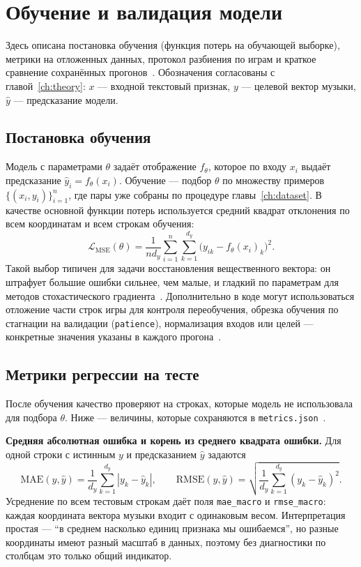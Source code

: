 \chapter{Обучение и валидация модели}
\label{ch:training}

Здесь описана постановка обучения (функция потерь на обучающей выборке), метрики на отложенных данных, протокол разбиения по играм и краткое сравнение сохранённых прогонов~\cite{nikolenko2018}. Обозначения согласованы с главой~\ref{ch:theory}: $x$ --- входной текстовый признак, $y$ --- целевой вектор музыки, $\hat y$ --- предсказание модели.

\section{Постановка обучения}

Модель с параметрами $\theta$ задаёт отображение $f_\theta$, которое по входу $x_i$ выдаёт предсказание $\hat y_i = f_\theta(x_i)$. Обучение --- подбор $\theta$ по множеству примеров $\{(x_i, y_i)\}_{i=1}^n$, где пары уже собраны по процедуре главы~\ref{ch:dataset}. В качестве основной функции потерь используется средний квадрат отклонения по всем координатам и всем строкам обучения:
\begin{equation}
\mathcal{L}_{\mathrm{MSE}}(\theta) = \frac{1}{n d_y} \sum_{i=1}^n \sum_{k=1}^{d_y} \bigl( y_{ik} - f_\theta(x_i)_k \bigr)^2 .
\label{eq:mse-ch3}
\end{equation}
Такой выбор типичен для задачи восстановления вещественного вектора: он штрафует большие ошибки сильнее, чем малые, и гладкий по параметрам для методов стохастического градиента~\cite{nikolenko2018}. Дополнительно в коде могут использоваться отложение части строк игры для контроля переобучения, обрезка обучения по стагнации на валидации (\texttt{patience}), нормализация входов или целей --- конкретные значения указаны в  каждого прогона~.

\section{Метрики регрессии на тесте}

После обучения качество проверяют на строках, которые модель не использовала для подбора $\theta$. Ниже --- величины, которые сохраняются в \texttt{metrics.json}~.

\textbf{Средняя абсолютная ошибка и корень из среднего квадрата ошибки.} Для одной строки с истинным $y$ и предсказанием $\hat y$ задаются
\[
\mathrm{MAE}(y, \hat y) = \frac{1}{d_y} \sum_{k=1}^{d_y} |y_k - \hat y_k|, \qquad
\mathrm{RMSE}(y, \hat y) = \sqrt{\frac{1}{d_y} \sum_{k=1}^{d_y} (y_k - \hat y_k)^2}.
\]
Усреднение по всем тестовым строкам даёт поля \texttt{mae\_macro} и \texttt{rmse\_macro}: каждая координата вектора музыки входит с одинаковым весом. Интерпретация простая --- ``в среднем насколько единиц признака мы ошибаемся'', но разные координаты имеют разный масштаб в данных, поэтому без диагностики по столбцам это только общий индикатор.

